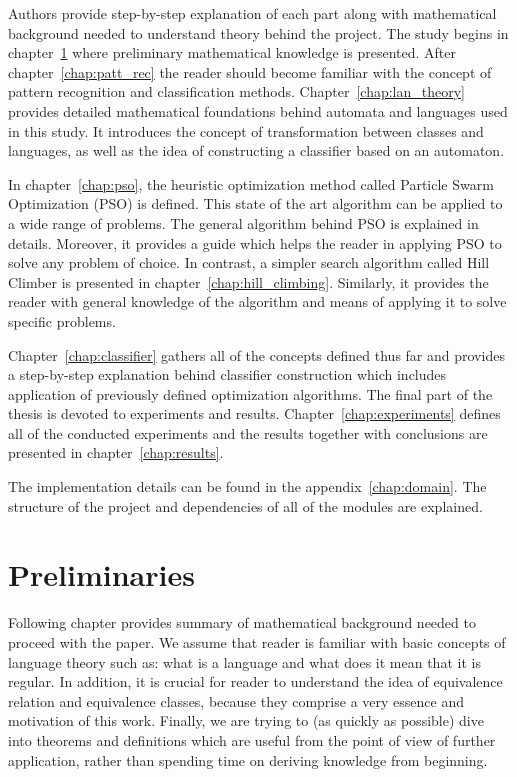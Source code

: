 \documentclass{mini}
\begin{document}
Authors provide step-by-step explanation of each part along with mathematical background needed to understand theory behind the project. The study begins in chapter~\ref{chap:prelim} where preliminary mathematical knowledge is presented.
After chapter~\ref{chap:patt_rec} the reader should become familiar with the concept of pattern recognition and classification methods. Chapter~\ref{chap:lan_theory} provides detailed mathematical foundations behind automata and languages used in this study. It introduces the concept of transformation between classes and languages, as well as the idea of constructing a classifier based on an automaton.

In chapter~\ref{chap:pso}, the heuristic optimization method called Particle Swarm Optimization (PSO) is defined. This state of the art algorithm can be applied to a wide range of problems. The
general algorithm behind PSO is explained in details. Moreover, it provides a guide which helps the reader in applying PSO to solve any problem of choice. In contrast, a simpler search algorithm called Hill Climber is presented in chapter~\ref{chap:hill_climbing}. Similarly, it provides the reader with general knowledge of the algorithm and means of applying it to solve specific problems.

Chapter~\ref{chap:classifier} gathers all of the concepts defined thus far and provides a step-by-step explanation behind classifier construction which includes application of previously defined optimization algorithms. The final part of the thesis is devoted to experiments and results.  Chapter~\ref{chap:experiments} defines all of the conducted experiments and the results together with conclusions are presented in chapter~\ref{chap:results}.

The implementation details can be found in the appendix~\ref{chap:domain}. The structure of the project and dependencies of all of the modules are explained.


\chapter{Preliminaries}\label{chap:prelim}
Following chapter provides summary of mathematical background needed to proceed with the paper. We assume that reader is familiar with basic concepts of language theory such as: what is a language and what does it mean that it is regular. In addition, it is crucial for reader to understand the idea of equivalence relation and equivalence classes, because they comprise a very essence and motivation of this work. Finally, we are trying to (as quickly as possible) dive into theorems and definitions which are useful from the point of view of further application, rather than spending time on deriving knowledge from beginning.
\end{document}
